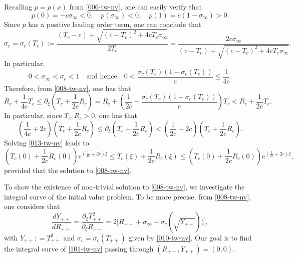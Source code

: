 \documentclass[12pt]{article}
\theoremstyle{definition}
\theoremstyle{remark}
\numberwithin{equation}{section}
\begin{document}
Recalling $ p = p(x) $ from \eqref{006-tw-nv}, one can easily verify that
\begin{equation}
\label{009-tw-nv}
    p(0) = - c \sigma_\infty < 0, \quad p(\sigma_\infty) < 0, \quad p(1) = c(1-\sigma_\infty) > 0.
\end{equation}
Since $ p $ has a positive leading order term, one can conclude that
\begin{equation}
\label{010-tw-nv}
    \sigma_c = \sigma_c (T_c) := \frac{(T_c - c) + \sqrt{(c-T_c)^2 + 4 c T_c \sigma_\infty}}{2 T_c} = \frac{2 c \sigma_\infty}{(c - T_c) + \sqrt{(c-T_c)^2 + 4 c T_c \sigma_\infty}}.
\end{equation}
In particular, 
\begin{equation}
    \label{011-tw-nv}
    0< \sigma_\infty < \sigma_c < 1 \quad \text{and hence} \quad 0 < \frac{\sigma_c(T_c) (1-\sigma_c(T_c))}{c} \leq \frac{1}{4c}.
\end{equation}
Therefore, from \eqref{008-tw-nv}, one has that 
\begin{equation}
    \label{012-tw-nv}
    R_c + \frac{1}{4c}T_c \leq \partial_\xi (T_c + \frac{1}{2c}R_c) = R_c + (\frac{1}{2c} - \frac{\sigma_c(T_c) (1-\sigma_c(T_c))}{c})T_c < R_c + \frac{1}{2c} T_c.
\end{equation}
In particular, since $ T_c, R_c >0 $, one has that
\begin{equation}
    \label{013-tw-nv}
    (\frac{1}{4c} + 2 c)(T_c + \frac{1}{2c}R_c) \leq \partial_\xi (T_c + \frac{1}{2c}R_c) < (\frac{1}{2c} + 2c ) (T_c + \frac{1}{2c}R_c).
\end{equation}
Solving \eqref{013-tw-nv} leads to 
\begin{equation}
    \label{014-tw-nv}
    (T_c(0) + \frac{1}{2c}R_c(0)) e^{(\frac{1}{4c} + 2c)\xi} \leq T_c(\xi) + \frac{1}{2c}R_c(\xi) \leq (T_c(0) + \frac{1}{2c}R_c(0)) e^{(\frac{1}{2c} + 2c)\xi},
\end{equation}
provided that the solution to \eqref{008-tw-nv}.

\smallskip

To show the existence of non-trivial solution to \eqref{008-tw-nv}, we investigate the integral curve of the initial value problem. To be more precise, from \eqref{008-tw-nv}, one considers that
\begin{equation}
    \label{101-tw-nv}
    \frac{d Y_{++}}{d R_{++}} = \frac{\partial_\xi T_{++}^2}{\partial_\xi R_{++}} = 2 \lbrack R_{++} + \sigma_\infty - \sigma_c(\sqrt{Y_{++}}) )\rbrack, 
\end{equation}
with $ Y_{++}: = T_{++}^2 $ and $ \sigma_c = \sigma_c(T_{++}) $ given by \eqref{010-tw-nv}. Our goal is to find the integral curve of \eqref{101-tw-nv} passing through $ (R_{++}, Y_{++}) = (0,0) $. 
\end{document}
